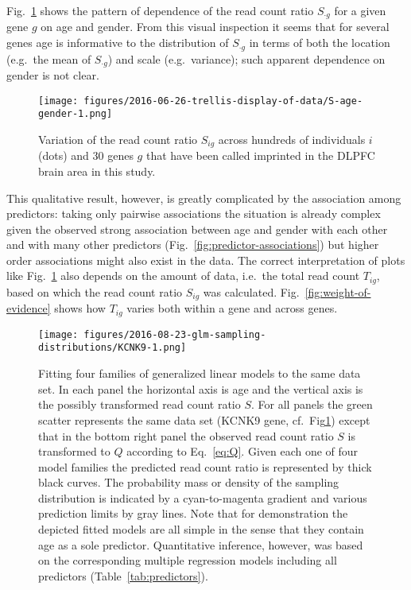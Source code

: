\documentclass[letterpaper]{article}
\begin{document}
Fig.~\ref{fig:S-age-gender} shows the pattern of dependence of
the read count ratio \(S_{\cdot g}\) for a given gene \(g\) on age and gender.  From
this visual inspection it seems that for several genes age is informative to
the distribution of \(S_{\cdot g}\) in terms of both the location (e.g.~the mean of
\(S_{\cdot g}\)) and scale (e.g.~variance); such apparent dependence on gender is not
clear.

\begin{figure}
\begin{center}
\texttt{[image: figures/2016-06-26-trellis-display-of-data/S-age-gender-1.png]}
\caption{
Variation of the read count ratio \(S_{ig}\) across hundreds of individuals
\(i\) (dots) and 30 genes \(g\) that have been called imprinted in the DLPFC
brain area in this study.
}
\label{fig:S-age-gender}
\end{center}
\end{figure}

This qualitative result, however, is greatly complicated by the association
among predictors: taking only pairwise associations the situation is already
complex given the observed strong association between age and gender with each
other and with many other predictors (Fig.~\ref{fig:predictor-associations})
but higher order associations might also exist in the data.
The correct interpretation of plots like Fig.~\ref{fig:S-age-gender} also depends on
the amount of data, i.e.~the total read count \(T_{ig}\), based on which the
read count ratio \(S_{ig}\) was calculated.  Fig.~\ref{fig:weight-of-evidence}
shows how \(T_{ig}\) varies both within a gene and across genes.

\begin{figure}
\begin{center}
\texttt{[image: figures/2016-08-23-glm-sampling-distributions/KCNK9-1.png]}
\end{center}
\caption{Fitting four families of generalized linear models to the same data
set.  In each panel the horizontal axis is age and the vertical axis is the
possibly transformed read count ratio \(S\).  For all panels the green scatter
represents the same data set (KCNK9 gene, cf.~Fig\ref{fig:S-age-gender})
except that in the bottom right panel the observed read count ratio \(S\) is
transformed to \(Q\) according to Eq.~\ref{eq:Q}.  Given each one of four model
families the predicted read count ratio is represented by thick black curves.
The probability mass or density of the sampling distribution is indicated by a
cyan-to-magenta gradient and various prediction limits by gray lines.  Note
that for demonstration the depicted fitted models are all simple in the sense
that they contain age as a sole predictor.  Quantitative inference, however,
was based on the corresponding multiple regression models including all
predictors (Table~\ref{tab:predictors}).
  }
\label{fig:predicted-curves}
\end{figure}
\end{document}
